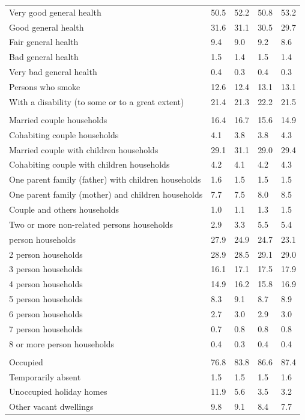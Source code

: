\documentclass{article}
\begin{document}
\begin{table}[h]
\begin{tabular}{KTTTT}
    \hline
Very good general health & 50.5& 52.2&50.8& 53.2\\
Good general health & 31.6& 31.1& 30.5& 29.7\\
Fair general health & 9.4& 9.0&9.2& 8.6\\
Bad general health & 1.5& 1.4&1.5& 1.4\\
Very bad general health & 0.4& 0.3&0.4& 0.3\\
    \hline
Persons who smoke & 12.6& 12.4&13.1& 13.1\\
    \hline
With a disability (to some or to a great extent) & 21.4& 21.3&22.2& 21.5\\
\hline
    \\ 
    \hline
Married couple households & 16.4& 16.7& 15.6& 14.9\\
Cohabiting couple households & 4.1& 3.8& 3.8& 4.3\\
Married couple with children households & 29.1& 31.1& 29.0& 29.4\\
Cohabiting couple with children households & 4.2& 4.1& 4.2& 4.3\\
One parent family (father) with  children households & 1.6& 1.5& 1.5& 1.5\\
One parent family (mother) and children households & 7.7& 7.5& 8.0& 8.5\\
Couple and others households  & 1.0& 1.1& 1.3& 1.5\\
Two or more non-related persons households & 2.9& 3.3& 5.5& 5.4\\
     person households & 27.9& 24.9& 24.7& 23.1\\
2 person households & 28.9& 28.5& 29.1& 29.0\\
3 person households & 16.1& 17.1& 17.5& 17.9\\
4 person households & 14.9& 16.2& 15.8& 16.9\\
5 person households & 8.3& 9.1& 8.7& 8.9\\
6 person households & 2.7& 3.0& 2.9& 3.0\\
7 person households & 0.7& 0.8& 0.8& 0.8\\
8 or more person households & 0.4& 0.3& 0.4& 0.4\\
\hline
    \\ 
    \hline
Occupied & 76.8& 83.8& 86.6& 87.4\\
Temporarily absent & 1.5& 1.5& 1.5& 1.6\\
Unoccupied holiday homes & 11.9&  5.6&  3.5&  3.2\\
Other vacant dwellings & 9.8& 9.1& 8.4& 7.7\\
\hline
\end{tabular}
\end{table}
\end{document}
